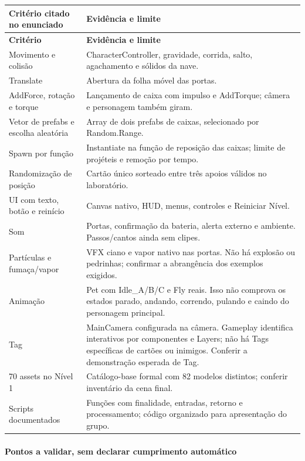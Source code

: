 \documentclass[12pt,a4paper]{article}
\begin{document}
\small
\begin{longtable}{|p{6.3cm}|p{8.7cm}|}
\hline
\textbf{Critério citado no enunciado} & \textbf{Evidência e limite}\\
\hline
\endfirsthead
\hline
\textbf{Critério} & \textbf{Evidência e limite}\\
\hline
\endhead
Movimento e colisão & CharacterController, gravidade, corrida, salto, agachamento e sólidos da nave.\\
\hline
Translate & Abertura da folha móvel das portas.\\
\hline
AddForce, rotação e torque & Lançamento de caixa com impulso e AddTorque; câmera e personagem também giram.\\
\hline
Vetor de prefabs e escolha aleatória & Array de dois prefabs de caixas, selecionado por Random.Range.\\
\hline
Spawn por função & Instantiate na função de reposição das caixas; limite de projéteis e remoção por tempo.\\
\hline
Randomização de posição & Cartão único sorteado entre três apoios válidos no laboratório.\\
\hline
UI com texto, botão e reinício & Canvas nativo, HUD, menus, controles e Reiniciar Nível.\\
\hline
Som & Portas, confirmação da bateria, alerta externo e ambiente. Passos/cantos ainda sem clipes.\\
\hline
Partículas e fumaça/vapor & VFX ciano e vapor nativo nas portas. Não há explosão ou pedrinhas; confirmar a abrangência dos exemplos exigidos.\\
\hline
Animação & Pet com Idle\_A/B/C e Fly reais. Isso não comprova os estados parado, andando, correndo, pulando e caindo do personagem principal.\\
\hline
Tag & MainCamera configurada na câmera. Gameplay identifica interativos por componentes e Layers; não há Tags específicas de cartões ou inimigos. Conferir a demonstração esperada de Tag.\\
\hline
70 assets no Nível 1 & Catálogo-base formal com 82 modelos distintos; conferir inventário da cena final.\\
\hline
Scripts documentados & Funções com finalidade, entradas, retorno e processamento; código organizado para apresentação do grupo.\\
\hline
\end{longtable}
\normalsize

\paragraph{Pontos a validar, sem declarar cumprimento automático}
\end{document}
